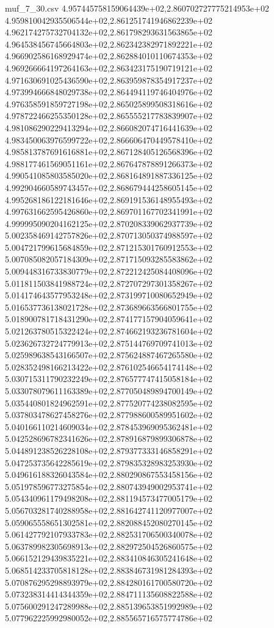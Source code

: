 \begin{filecontents*}{muf_7_30.csv}
4.957445758159064439e+02,2.860702727775214953e+02
4.959810042935506544e+02,2.861251741946862239e+02
4.962174275732704132e+02,2.861798293631563865e+02
4.964538456745664803e+02,2.862342382971892221e+02
4.966902586168929474e+02,2.862884010110674353e+02
4.969266664197264163e+02,2.863423175190719121e+02
4.971630691025436590e+02,2.863959878354917237e+02
4.973994666848029738e+02,2.864494119746404976e+02
4.976358591859727198e+02,2.865025899508318616e+02
4.978722466255350128e+02,2.865555217783839907e+02
4.981086290229413294e+02,2.866082074716441639e+02
4.983450063976599722e+02,2.866606470449578410e+02
4.985813787691616881e+02,2.867128405126568396e+02
4.988177461569051161e+02,2.867647878891266373e+02
4.990541085803585020e+02,2.868164891887336125e+02
4.992904660589743457e+02,2.868679444258605145e+02
4.995268186122181646e+02,2.869191536148955493e+02
4.997631662595426860e+02,2.869701167702341991e+02
4.999995090204162125e+02,2.870208339062937739e+02
5.002358469142757826e+02,2.870713050374988597e+02
5.004721799615684859e+02,2.871215301760912553e+02
5.007085082057184309e+02,2.871715093285583862e+02
5.009448316733830779e+02,2.872212425084408096e+02
5.011811503841988724e+02,2.872707297301358267e+02
5.014174643577953248e+02,2.873199710080652949e+02
5.016537736138021728e+02,2.873689663566801755e+02
5.018900781718431290e+02,2.874177157904059641e+02
5.021263780515322424e+02,2.874662193236781604e+02
5.023626732724779913e+02,2.875144769709741013e+02
5.025989638543166507e+02,2.875624887467265580e+02
5.028352498166213422e+02,2.876102546654174148e+02
5.030715311790232249e+02,2.876577747415058184e+02
5.033078079611163389e+02,2.877050489894700149e+02
5.035440801824962591e+02,2.877520774238082595e+02
5.037803478627458276e+02,2.877988600589951602e+02
5.040166110214609034e+02,2.878453969095362481e+02
5.042528696782341626e+02,2.878916879899306878e+02
5.044891238526228108e+02,2.879377333146858291e+02
5.047253735642285619e+02,2.879835328983253930e+02
5.049616188326043584e+02,2.880290867553458156e+02
5.051978596773275854e+02,2.880743949002953741e+02
5.054340961179498208e+02,2.881194573477005179e+02
5.056703281740288958e+02,2.881642741120977007e+02
5.059065558651302581e+02,2.882088452080270145e+02
5.061427792107933783e+02,2.882531706500340078e+02
5.063789982305698913e+02,2.882972504526860575e+02
5.066152129439835221e+02,2.883410846305241648e+02
5.068514233705818128e+02,2.883846731981284393e+02
5.070876295298893979e+02,2.884280161700580720e+02
5.073238314414344359e+02,2.884711135608822588e+02
5.075600291247289988e+02,2.885139653851992989e+02
5.077962225992980052e+02,2.885565716575774786e+02

\end{filecontents*}
